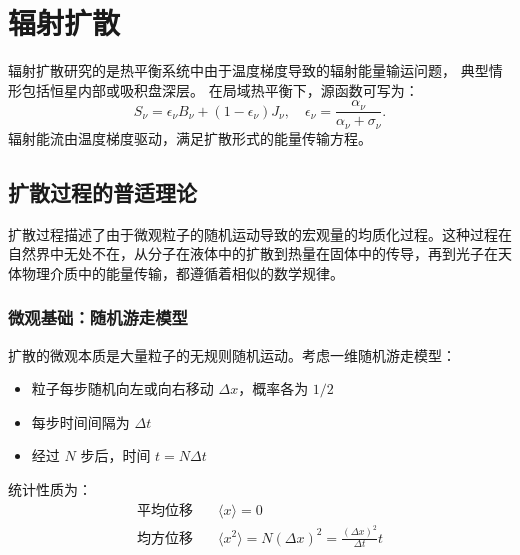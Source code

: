 \section{辐射扩散}


辐射扩散研究的是热平衡系统中由于温度梯度导致的辐射能量输运问题，
典型情形包括恒星内部或吸积盘深层。
在局域热平衡下，源函数可写为：
\[
S_\nu = \epsilon_\nu B_\nu + (1 - \epsilon_\nu) J_\nu, 
\quad \epsilon_\nu = \frac{\alpha_\nu}{\alpha_\nu + \sigma_\nu}.
\]
辐射能流由温度梯度驱动，满足扩散形式的能量传输方程。


\subsection{扩散过程的普适理论}


扩散过程描述了由于微观粒子的随机运动导致的宏观量的均质化过程。这种过程在自然界中无处不在，从分子在液体中的扩散到热量在固体中的传导，再到光子在天体物理介质中的能量传输，都遵循着相似的数学规律。

\subsubsection*{微观基础：随机游走模型}

扩散的微观本质是大量粒子的无规则随机运动。考虑一维随机游走模型：
\begin{itemize}
  \item 粒子每步随机向左或向右移动 $\Delta x$，概率各为 $1/2$
  \item 每步时间间隔为 $\Delta t$
  \item 经过 $N$ 步后，时间 $t = N\Delta t$
\end{itemize}

统计性质为：
\begin{align*}
\text{平均位移} &\quad \langle x \rangle = 0 \\
\text{均方位移} &\quad \langle x^2 \rangle = N(\Delta x)^2 = \frac{(\Delta x)^2}{\Delta t} t
\end{align*}

